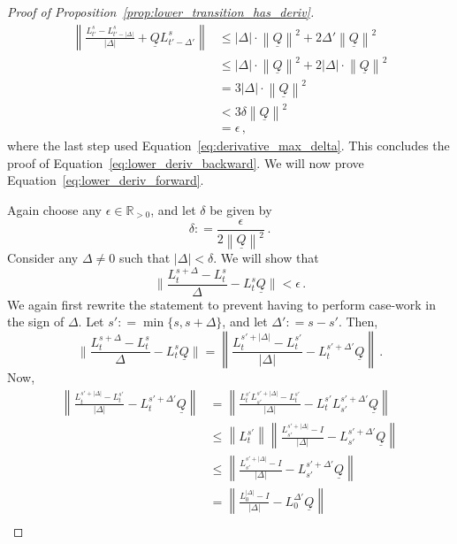 \documentclass[10pt]{paper}
\theoremstyle{definition}
\newcommand{\reals}{\mathbb{R}}
\newcommand{\realspos}{\reals_{>0}}
\newcommand{\lbound}{L}
\newcommand{\lrate}{\underline{Q}}
\newcommand{\norm}[1]{\left\lVert #1 \right\rVert}
\newcommand{\coloneqq}{:\!=}
\begin{document}
\begin{proof}[Proof of Proposition~\ref{prop:lower_transition_has_deriv}]
\begin{align*}
\norm{\frac{L_{t'}^s - L_{t'-\lvert\Delta\rvert}^s}{\lvert\Delta\rvert}+\lrate L_{t'-\Delta'}^s} &\leq \lvert\Delta\rvert\cdot\norm{\lrate}^2 + 2\Delta'\norm{\lrate}^2 \\
 &\leq \lvert\Delta\rvert\cdot\norm{\lrate}^2 + 2\lvert\Delta\rvert\cdot\norm{\lrate}^2 \\
 &= 3\lvert\Delta\rvert\cdot\norm{\lrate}^2 \\
 &< 3\delta\norm{\lrate}^2 \\
 &= \epsilon\,,
\end{align*}
where the last step used Equation~\eqref{eq:derivative_max_delta}. This concludes the proof of Equation~\eqref{eq:lower_deriv_backward}. We will now prove Equation~\eqref{eq:lower_deriv_forward}.

Again choose any $\epsilon\in\realspos$, and let $\delta$ be given by
\begin{equation*}
\delta \coloneqq \frac{\epsilon}{2\norm{\lrate}^2}\,.
\end{equation*}
Consider any $\Delta\neq 0$ such that $\lvert\Delta\rvert<\delta$. We will show that
\begin{equation*}
\Big\lVert\frac{L_{t}^{s+\Delta}-L_t^s}{\Delta}-\lbound_t^s\lrate \Big\rVert<\epsilon\,.
\end{equation*}
We again first rewrite the statement to prevent having to perform case-work in the sign of $\Delta$. Let $s'\coloneqq\min\{s,s+\Delta\}$, and let $\Delta'\coloneqq s-s'$. Then,
\begin{equation*}
\Big\lVert\frac{L_{t}^{s+\Delta}-L_t^s}{\Delta}-\lbound_t^s\lrate \Big\rVert = \norm{\frac{L_t^{s'+\lvert\Delta\rvert} - L_t^{s'}}{\lvert\Delta\rvert} - L_t^{s'+\Delta'}\lrate}\,.
\end{equation*}
Now,
\begin{align*}
\norm{\frac{L_t^{s'+\lvert\Delta\rvert} - L_t^{s'}}{\lvert\Delta\rvert} - L_t^{s'+\Delta'}\lrate} &= \norm{\frac{L_t^{s'}L_{s'}^{s'+\lvert\Delta\rvert} - L_t^{s'}}{\lvert\Delta\rvert} - L_t^{s'}L_{s'}^{s'+\Delta'}\lrate} \\
 &\leq \norm{L_t^{s'}}\norm{\frac{L_{s'}^{s'+\lvert\Delta\rvert} - I}{\lvert\Delta\rvert} - L_{s'}^{s'+\Delta'}\lrate} \\
 &\leq \norm{\frac{L_{s'}^{s'+\lvert\Delta\rvert} - I}{\lvert\Delta\rvert} - L_{s'}^{s'+\Delta'}\lrate} \\
 &= \norm{\frac{L_{0}^{\lvert\Delta\rvert} - I}{\lvert\Delta\rvert} - L_{0}^{\Delta'}\lrate} \\

\end{align*}
\end{proof}
\end{document}
